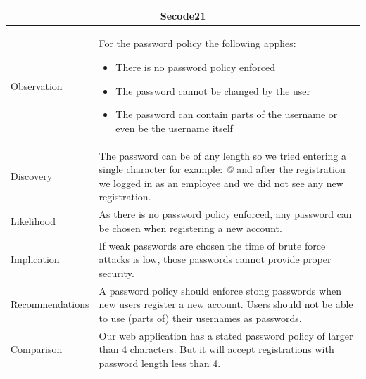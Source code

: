 \documentclass[headsepline,footsepline,footinclude=false,oneside,fontsize=11pt,paper=a4,listof=totoc,bibliography=totoc]{scrbook} %
\begin{document}
\begin{tabular}{ l|p{11cm}  }
	\hline
	\multicolumn{2}{c}{\textbf{Secode21}} \\
	\hline
	Observation   & For the password policy the following applies:\
	
	\begin{itemize}
		\item There is no password policy enforced
		\item The password cannot be changed by the user
		\item The password can contain parts of the username or even be the username itself
	 
	\end{itemize} \\
	
	Discovery  & The password can be of any length so we tried entering a single character for example: \textit{@} and after the registration we logged in as an employee and we did not see any new registration. \\
	
	Likelihood & As there is no password policy enforced, any password can be chosen when registering a new account. \\
	Implication    & If weak passwords are chosen the time of brute force attacks is low, those passwords cannot provide proper security. \\
	Recommendations & A password policy should enforce stong passwords when new users register a new
	account. Users should not be able to use (parts of) their usernames as passwords. \\
	Comparison & Our web application has a stated password policy of larger than 4 characters. But it will accept registrations with password length less than 4.\\
	\hline
\end{tabular}
\\
\vspace{0.5cm}
\\
\end{document}
